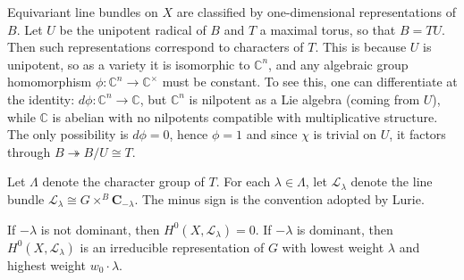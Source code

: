 \documentclass[12pt]{article}
\begin{document}
Equivariant line bundles on $X$ are classified by one-dimensional representations of $B$. Let $U$ be the unipotent radical of $B$ and $T$ a maximal torus, so that $B = TU$. Then such representations correspond to characters of $T$. This is because $U$ is unipotent, so as a variety it is isomorphic to $\mathbb C^n$, and any algebraic group homomorphism
$\phi : \mathbb C^n \to \mathbb C^\times$
must be constant. To see this, one can differentiate at the identity:
$d\phi : \mathbb C^n \to \mathbb C$, but $\mathbb C^n$ is nilpotent as a Lie algebra (coming from $U$), while $\mathbb C$ is abelian with no nilpotents compatible with multiplicative structure. The only possibility is $d\phi=0$, hence $\phi=1$ and since $\chi$ is trivial on $U$, it factors through $B \twoheadrightarrow B/U \cong T$.


Let $\Lambda$ denote the character group of $T$. For each $\lambda \in \Lambda$, let $\mathcal L_\lambda$ denote the line bundle $\mathcal L_\lambda \cong G\times^B \mathbf C_{-\lambda}$. The minus sign is the convention adopted by Lurie.

\begin{theorem}
If $-\lambda$ is not dominant, then $H^0(X,\mathcal L_\lambda)=0$. If $-\lambda$ is dominant, then $H^0(X,\mathcal L_\lambda)$ is an irreducible representation of $G$ with lowest weight $\lambda$ and highest weight $w_0\cdot \lambda$.
\end{theorem}
\end{document}
